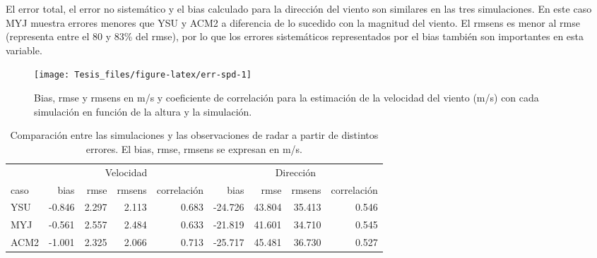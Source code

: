 \documentclass[12pt,spanish,oneside, a4paper]{book}
\begin{document}
El error total, el error no sistemático y el bias calculado para la
dirección del viento son similares en las tres simulaciones. En este
caso MYJ muestra errores menores que YSU y ACM2 a diferencia de lo
sucedido con la magnitud del viento. El rmsens es menor al rmse
(representa entre el 80 y 83\% del rmse), por lo que los errores
sistemáticos representados por el bias también son importantes en esta
variable.

\begin{figure}

{\centering \texttt{[image: Tesis\_files/figure-latex/err-spd-1]} 

}

\caption{Bias, rmse y rmsens en m/s y coeficiente de correlación para la estimación de la velocidad del viento (m/s) con cada simulación en función de la altura y la simulación. \label{err-spd}}\label{fig:err-spd}
\end{figure}

\begin{table}

\caption{\label{tab:err-tabla}Comparación entre las simulaciones y las observaciones de radar a partir de distintos errores. El bias, rmse, rmsens se expresan en m/s. \label{err}}
\centering
\begin{tabular}[t]{lrrrrrrrr}
\toprule
\multicolumn{1}{c}{ } & \multicolumn{4}{c}{Velocidad} & \multicolumn{4}{c}{Dirección} \\
\cmidrule(l{2pt}r{2pt}){2-5} \cmidrule(l{2pt}r{2pt}){6-9}
caso & bias & rmse & rmsens & correlación & bias & rmse & rmsens & correlación\\
\midrule
YSU & -0.846 & 2.297 & 2.113 & 0.683 & -24.726 & 43.804 & 35.413 & 0.546\\
MYJ & -0.561 & 2.557 & 2.484 & 0.633 & -21.819 & 41.601 & 34.710 & 0.545\\
ACM2 & -1.001 & 2.325 & 2.066 & 0.713 & -25.717 & 45.481 & 36.730 & 0.527\\
\bottomrule
\end{tabular}
\end{table}
\end{document}
